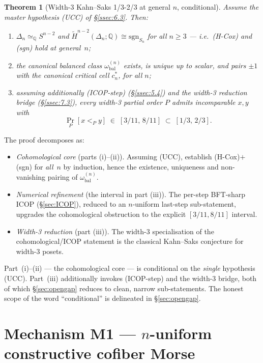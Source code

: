 \documentclass[11pt,reqno]{amsart}
\theoremstyle{plain}
\newtheorem{theorem}{Theorem}[section]
\theoremstyle{definition}
\newcommand{\Hred}{\widetilde H}
\newcommand{\sgn}{\mathrm{sgn}}
\newcommand{\Q}{\mathbb{Q}}
\newcommand{\omegabal}[1]{\omega_{\mathrm{bal}}^{(#1)}}
\newcommand{\cstar}[1]{c^{*}_{#1}}
\newcommand{\UCC}{\textup{(UCC)}}
\newcommand{\ICOPstep}{\textup{(ICOP-step)}}
\begin{document}
\begin{theorem}[Width-3 Kahn--Saks 1/3-2/3 at general $n$, conditional]
\label{thm:main}
Assume the master hypothesis \UCC{} of \S\ref{ssec:6.3}. Then:
\begin{enumerate}[leftmargin=2em,label=(\roman*)]
  \item $\Delta_n\simeq_{\Q}S^{n-2}$ and
        $\Hred^{n-2}(\Delta_n;\Q)\cong\sgn_{S_n}$ for all $n\ge3$ ---
        i.e.\ \textup{(H-Cox)} and \textup{(sgn)} hold at general~$n$;
  \item the canonical balanced class $\omegabal n$ exists, is unique up
        to scalar, and pairs $\pm1$ with the canonical critical cell
        $\cstar n$, for all $n$;
  \item assuming additionally \ICOPstep{} \textup{(\S\ref{ssec:5.4})}
        and the width-3 reduction bridge \textup{(\S\ref{ssec:7.3})},
        every width-3 partial order $P$ admits incomparable $x,y$ with
        \[
          \Pr_P[x<_Py]\;\in\;[3/11,\,8/11]\;\subset\;[1/3,\,2/3].
        \]
\end{enumerate}
\end{theorem}

The proof decomposes as:
\begin{itemize}[leftmargin=1.6em]
  \item \emph{Cohomological core} (parts (i)--(ii)). Assuming \UCC,
        establish (H-Cox)$+$(sgn) for \emph{all}~$n$ by induction,
        hence the existence, uniqueness and non-vanishing pairing of
        $\omegabal n$.
  \item \emph{Numerical refinement} (the interval in part (iii)). The
        per-step BFT-sharp ICOP (\S\ref{sec:ICOP}), reduced to an
        $n$-uniform last-step sub-statement, upgrades the cohomological
        obstruction to the explicit $[3/11,8/11]$ interval.
  \item \emph{Width-3 reduction} (part (iii)). The width-3
        specialisation of the cohomological/ICOP statement is the
        classical Kahn--Saks conjecture for width-3 posets.
\end{itemize}
Part~(i)--(ii) --- the cohomological core --- is conditional on the
\emph{single} hypothesis \UCC. Part~(iii) additionally invokes
\ICOPstep{} and the width-3 bridge, both of which \S\ref{sec:opengap}
reduces to clean, narrow sub-statements. The honest scope of the word
``conditional'' is delineated in \S\ref{sec:opengap}.

\section{Mechanism M1 --- $n$-uniform constructive cofiber Morse}\label{sec:M1}
\end{document}
